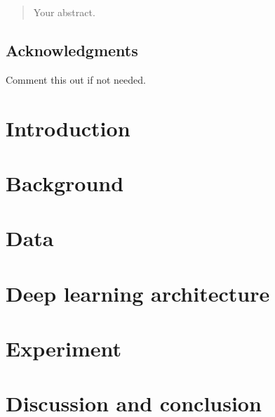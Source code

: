 \documentclass[12pt,twoside]{report}
\date{June 2020}
\begin{document}



\clearpage{\pagestyle{empty}\cleardoublepage}
\setcounter{page}{1}
\pagestyle{fancy}

\begin{abstract}
Your abstract.
\end{abstract}

\cleardoublepage
\section*{Acknowledgments}
Comment this out if not needed.

\clearpage{\pagestyle{empty}\cleardoublepage}


\tableofcontents 


\clearpage{\pagestyle{empty}\cleardoublepage}
\setcounter{page}{1}
\fancyhead[LE,RO]{\slshape \rightmark}
\fancyhead[LO,RE]{\slshape \leftmark}


\chapter{Introduction}


\chapter{Background}


\chapter{Data}


\chapter{Deep learning architecture}


\chapter{Experiment}


\chapter{Discussion and conclusion}







\end{document}
